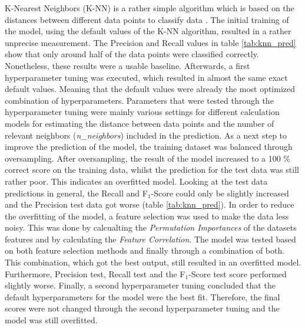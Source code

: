 K-Nearest Neighbors (K-NN) is a rather simple algorithm which is based on the distances between different data points to classify data \citep{Yildirim2020}. %
The initial training of the model, using the default values of the K-NN algorithm, resulted in a rather unprecise measurement. The Precision and Recall values in table \ref{tab:knn_pred} show that only around half of the data points were classified correctly. %
Nonetheless, these results were a usable baseline. Afterwards, a first hyperparameter tuning was executed, which resulted in almost the same exact default values. Meaning that the default values were already the most optimized combination of hyperparameters. Parameters that were tested through the hyperparameter tuning were mainly various settings for different calculation models for estimating the distance between data points and the number of relevant neighbors (\textit{n\_neighbors}) included in the prediction. %
As a next step to improve the prediction of the model, the training dataset was balanced through oversampling. After oversampling, the result of the model increased to a 100 \% correct score on the training data, whilst the prediction for the test data was still rather poor. This indicates an overfitted model. Looking at the test data predictions in general, the Recall and F$_1$-Score could only be slightly increased and the Precision test data got worse (table \ref{tab:knn_pred}). %
In order to reduce the overfitting of the model, a feature selection was used to make the data less noisy. This was done by calcualting the \textit{Permutation Importances} of the datasets features and by calculating the \textit{Feature Correlation}. The model was tested based on both feature selection methods and finally through a combination of both. This combination, which got the best output, still resulted in an overfitted model. Furthermore, Precision test, Recall test and the F$_1$-Score test score performed slightly worse. %
Finally, a second hyperparameter tuning concluded that the default hyperparameters for the model were the best fit. Therefore, the final scores were not changed through the second hyperparameter tuning and the model was still overfitted. %


